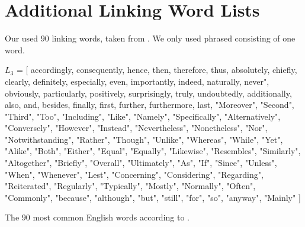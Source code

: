 \section{Additional Linking Word Lists}

Our used $90$ linking words, taken from \cite{linking}. We only used phrased consisting of one word.

$L_3$ = [
		accordingly,
        consequently,
        hence,
        then,
        therefore,
        thus,
        absolutely,
        chiefly,
        clearly,
        definitely,
        especially,
        even,
        importantly,
        indeed,
        naturally,
        never",
        obviously,
        particularly,
        positively,
        surprisingly,
        truly,
        undoubtedly,
        additionally,
        also,
        and,
        besides,
        finally,
        first,
        further,
        furthermore,
        last,
        "Moreover",
        "Second",
        "Third",
        "Too",
        "Including",
        "Like",
        "Namely",
        "Specifically",
        "Alternatively",
        "Conversely",
        "However",
        "Instead",
        "Nevertheless",
        "Nonetheless",
        "Nor",
        "Notwithstanding",
        "Rather",
        "Though",
        "Unlike",
        "Whereas",
        "While",
        "Yet",
        "Alike",
        "Both",
        "Either",
        "Equal",
        "Equally",
        "Likewise",
        "Resembles",
        "Similarly",
        "Altogether",
        "Briefly",
        "Overall",
        "Ultimately",
        "As",
        "If",
        "Since",
        "Unless",
        "When",
        "Whenever",
        "Lest",
        "Concerning",
        "Considering",
        "Regarding",
        "Reiterated",
        "Regularly",
        "Typically",
        "Mostly",
        "Normally",
        "Often",
        "Commonly",
        "because",
        "although",
        "but",
        "still",
        "for",
        "so",
        "anyway",
        "Mainly"
]

The $90$ most common English words according to \cite{mostcommon}.

